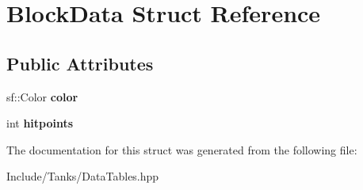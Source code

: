 \hypertarget{struct_block_data}{}\section{Block\+Data Struct Reference}
\label{struct_block_data}
\subsection*{Public Attributes}
\begin{DoxyCompactItemize}
\item 
\hypertarget{struct_block_data_ab249be575a3ca36bea0a8ccbaae7555e}{}sf\+::\+Color {\bfseries color}\label{struct_block_data_ab249be575a3ca36bea0a8ccbaae7555e}

\item 
\hypertarget{struct_block_data_aaddfc6d873f27fab19c5034d0144fe00}{}int {\bfseries hitpoints}\label{struct_block_data_aaddfc6d873f27fab19c5034d0144fe00}

\end{DoxyCompactItemize}


The documentation for this struct was generated from the following file\+:\begin{DoxyCompactItemize}
\item 
Include/\+Tanks/Data\+Tables.\+hpp\end{DoxyCompactItemize}

